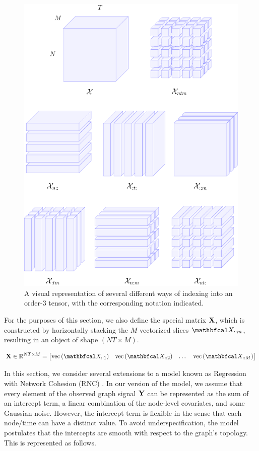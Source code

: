 \begin{figure}[t]  
    \centering
    \includegraphics[width=0.6\linewidth]{Figures/X_tensor.pdf}
    \caption[Tensor indexing notation]{A visual representation of several different ways of indexing into an order-3 tensor, with the corresponding notation indicated.}
    \label{fig:X_tensor_indexing}
\end{figure}


For the purposes of this section, we also define the special matrix $\mathbf{X}$, which is constructed by horizontally stacking the $M$ vectorized slices $\Xt_{::m}$, resulting in an object of shape $(NT \times M)$. 

\begin{equation}
    \label{eq:X_RNC}
    \X \in \R^{NT \times M} = \begin{bmatrix} \vecc{\Xt_{::1}} & \vecc{\Xt_{::2}} & \dots & \vecc{\Xt_{::M}} \end{bmatrix}    
\end{equation}

In this section, we consider several extensions to a model known as Regression with Network Cohesion (RNC) \citep{Li2019}. In our version of the model, we assume that every element of the observed graph signal $\mathbf{Y}$ can be represented as the sum of an intercept term, a linear combination of the node-level covariates, and some Gaussian noise. However, the intercept term is flexible in the sense that each node/time can have a distinct value. To avoid underspecification, the model postulates that the intercepts are smooth with respect to the graph's topology. This is represented as follows. 

